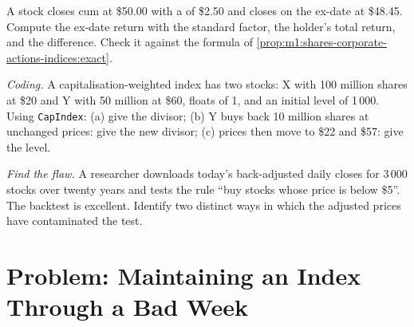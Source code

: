 \begin{exercise}[$\star\star$]\label{exo:m1:shares-corporate-actions-indices:6}
A stock closes cum at \$50.00 with a  of \$2.50 and closes on the
ex-date at \$48.45. Compute the ex-date return with the standard factor, the
holder's total return, and the difference. Check it against the formula of
\cref{prop:m1:shares-corporate-actions-indices:exact}.
\end{exercise}

\begin{exercise}[$\star\star\star$]\label{exo:m1:shares-corporate-actions-indices:7}
\emph{Coding.} A capitalisation-weighted index has two stocks: X with 100
million shares at \$20 and Y with 50 million at \$60, floats of 1, and an
initial level of 1\,000. Using \texttt{CapIndex}: (a) give the divisor; (b) Y
buys back 10 million shares at unchanged prices: give the new divisor; (c)
prices then move to \$22 and \$57: give the level.
\end{exercise}

\begin{exercise}[$\star\star\star$]\label{exo:m1:shares-corporate-actions-indices:8}
\emph{Find the flaw.} A researcher downloads today's back-adjusted daily
closes for 3\,000 stocks over twenty years and tests the rule ``buy stocks
whose price is below \$5''. The backtest is excellent. Identify two distinct
ways in which the adjusted prices have contaminated the test.
\end{exercise}

\section{Problem: Maintaining an Index Through a Bad Week}

